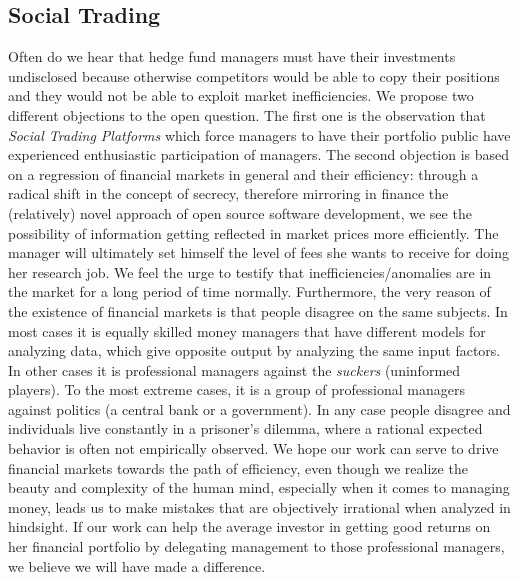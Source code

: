 \documentclass[9pt,oneside]{amsart}
\begin{document}
\begin{multicols}{2}
\section{Social Trading} \label{ch:create}
Often do we hear that hedge fund managers must have their investments undisclosed because otherwise competitors would be able to copy their positions and they would not be able to exploit market inefficiencies. We propose two different objections to the open question. The first one is the observation that \textit{Social Trading Platforms} which force managers to have their portfolio public have experienced enthusiastic participation of managers. The second objection is based on a regression of financial markets in general and their efficiency: through a radical shift in the concept of secrecy, therefore mirroring in finance the (relatively) novel approach of open source software development, we see the possibility of information getting reflected in market prices more efficiently. The manager will ultimately set himself the level of fees she wants to receive for doing her research job. We feel the urge to testify that inefficiencies/anomalies are in the market for a long period of time normally. Furthermore, the very reason of the existence of financial markets is that people disagree on the same subjects. In most cases it is equally skilled money managers that have different models for analyzing data, which give opposite output by analyzing the same input factors. In other cases it is professional managers against the \textit{suckers} (uninformed players). To the most extreme cases, it is a group of professional managers against politics (a central bank or a government). In any case people disagree and individuals live constantly in a prisoner's dilemma, where a rational expected behavior is often not empirically observed.
We hope our work can serve to drive financial markets towards the path of efficiency, even though we realize the beauty and complexity of the human mind, especially when it comes to managing money, leads us to make mistakes that are objectively irrational when analyzed in hindsight.
If our work can help the average investor in getting good returns on her financial portfolio by delegating management to those professional managers, we believe we will have made a difference.


\end{multicols}
\end{document}
